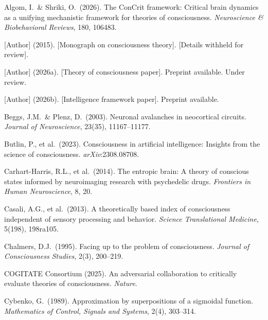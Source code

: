 \documentclass[11pt]{article}
\begin{document}
\begin{enumerate}[label={[\arabic*]}, nosep, leftmargin=*]

\item \label{ref:algom} Algom, I.\ \& Shriki, O.\ (2026). The ConCrit framework: Critical brain dynamics as a unifying mechanistic framework for theories of consciousness. \emph{Neuroscience \& Biobehavioral Reviews}, 180, 106483.

\item \label{ref:author2015} [Author] (2015). [Monograph on consciousness theory]. [Details withheld for review].

\item \label{ref:author2026a} [Author] (2026a). [Theory of consciousness paper]. Preprint available. Under review.

\item \label{ref:author2026b} [Author] (2026b). [Intelligence framework paper]. Preprint available.

\item \label{ref:beggs} Beggs, J.M.\ \& Plenz, D.\ (2003). Neuronal avalanches in neocortical circuits. \emph{Journal of Neuroscience}, 23(35), 11167--11177.

\item \label{ref:butlin} Butlin, P., et al.\ (2023). Consciousness in artificial intelligence: Insights from the science of consciousness. \emph{arXiv}:2308.08708.

\item \label{ref:carhart2014} Carhart-Harris, R.L., et al.\ (2014). The entropic brain: A theory of conscious states informed by neuroimaging research with psychedelic drugs. \emph{Frontiers in Human Neuroscience}, 8, 20.

\item \label{ref:casali} Casali, A.G., et al.\ (2013). A theoretically based index of consciousness independent of sensory processing and behavior. \emph{Science Translational Medicine}, 5(198), 198ra105.

\item \label{ref:chalmers1995} Chalmers, D.J.\ (1995). Facing up to the problem of consciousness. \emph{Journal of Consciousness Studies}, 2(3), 200--219.

\item \label{ref:cogitate} COGITATE Consortium (2025). An adversarial collaboration to critically evaluate theories of consciousness. \emph{Nature}.

\item \label{ref:cybenko} Cybenko, G.\ (1989). Approximation by superpositions of a sigmoidal function. \emph{Mathematics of Control, Signals and Systems}, 2(4), 303--314.


\end{enumerate}
\end{document}
